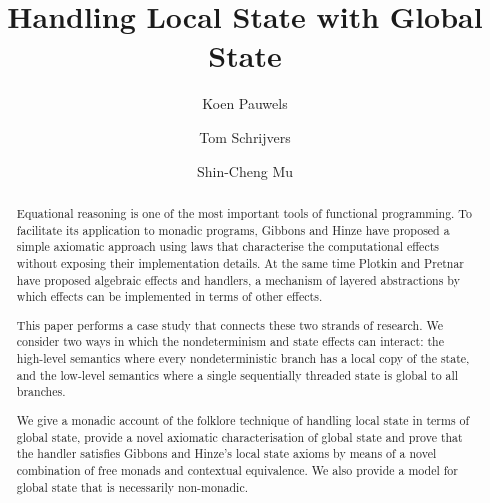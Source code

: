 \documentclass{jfp}
\begin{document}

\title{Handling Local State with Global State}

\begin{authgrp}
  \author{Koen Pauwels}
  \author{Tom Schrijvers}
  \author{Shin-Cheng Mu}
\end{authgrp}

\begin{abstract}
Equational reasoning is one of the most important tools of functional
programming.
To facilitate its application to monadic programs, Gibbons and Hinze have
proposed a simple axiomatic approach using laws that characterise the
computational effects without exposing their implementation details.  At the
same time Plotkin and Pretnar have proposed algebraic effects and handlers, a
mechanism of layered abstractions by which effects can be implemented in terms of
other effects.

This paper performs a case study that connects these two strands of research.
We consider two ways in which the nondeterminism and state effects can
interact: the high-level semantics where every nondeterministic branch has a
local copy of the state, and the low-level semantics where a single sequentially threaded  state is
global to all branches.

We give a monadic account of the folklore technique of handling local state in
terms of global state, provide a novel axiomatic characterisation of global
state and prove that the handler satisfies Gibbons and Hinze's local state
axioms by means of a novel combination of free monads and contextual
equivalence. We also provide a model for global state that is necessarily
non-monadic.
\end{abstract}

\end{document}
